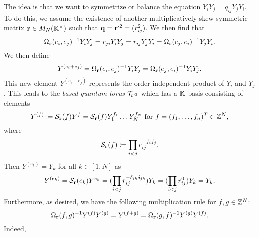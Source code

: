 The idea is that we want to symmetrize or balance the equation $Y_i Y_j = q_{ij} Y_j
	Y_i$. To do this, we assume the existence of another multiplicatively skew-symmetric
matrix $\mathbf{r} \in M_N(\mathbb{K}^\times)$ such that $\mathbf{q} = \mathbf{r}^{\cdot 2} = (r_{ij}^2)$. We
then find that
\begin{equation*}
	\Omega_{\mathbf{r}}(e_i, e_j)^{-1} Y_i Y_j = r_{ji} Y_i Y_j = r_{ij} Y_j Y_i = \Omega_{\mathbf{r}} (e_j, e_i)^{-1} Y_j Y_i.
\end{equation*}
%
We then define
\begin{equation*}
	Y^{(e_i + e_j)} = \Omega_{\mathbf{r}}(e_i, e_j)^{-1} Y_i Y_j = \Omega_{\mathbf{r}}(e_j, e_i)^{-1} Y_i Y_j.
\end{equation*}
%
This new element $Y^{(e_i + e_j)}$ represents the order-independent product of $Y_i$
and $Y_j$. This leads to the \emph{based quantum torus}
$\mathcal{T}_{\mathbf{r}^{\cdot 2}}$ which has a $\mathbb{K}$-basis consisting of elements
\begin{equation*}
	Y^{(f)} \coloneq \mathcal{S}_{\mathbf{r}}(f)Y^f = \mathcal{S}_{\mathbf{r}}(f)Y_1^{f_1}\dots Y_N^{f_N}
	\text{ for } f = (f_1, \dots, f_n)^T \in \mathbb{Z}^N,
\end{equation*}
where
\begin{equation*}
	\mathcal{S}_{\mathbf{r}}(f) \coloneq \prod_{i < j}r_{ij}^{-f_if_j}.
\end{equation*}
Then $Y^{(e_k)} = Y_k$ for all $k \in [1, N]$ as
\begin{align*}
	Y^{(e_k)}
	= \mathcal{S}_{\mathbf{r}}(e_k)Y^{e_k}
	= (\prod_{i < j}r_{ij}^{-\delta_{ik}\delta_{jk}} )Y_k
	= (\prod_{i < j}r_{ij}^0 )Y_k
	= Y_k.
\end{align*}
Furthermore, as desired, we have the following multiplication rule for $f,g \in \mathbb{Z}^N$:
\begin{equation*}
	\Omega_{\mathbf{r}}(f,g)^{-1} Y^{(f)}Y^{(g)} = Y^{(f+g)} = \Omega_{\mathbf{r}} (g, f)^{-1} Y^{(g)}Y^{(f)}.
\end{equation*}
Indeed,
